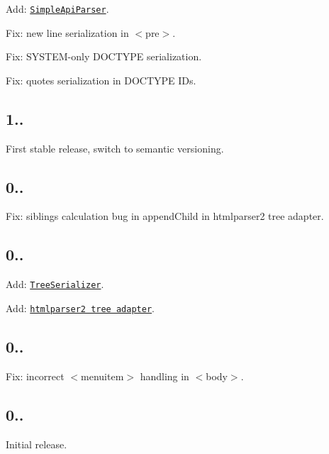 \begin{DoxyItemize}
\item Add\+: \href{https://github.com/inikulin/parse5/#class-simpleapiparser}{\tt Simple\+Api\+Parser}.
\item Fix\+: new line serialization in {\ttfamily $<$pre$>$}.
\item Fix\+: {\ttfamily S\+Y\+S\+T\+EM}-\/only {\ttfamily D\+O\+C\+T\+Y\+PE} serialization.
\item Fix\+: quotes serialization in {\ttfamily D\+O\+C\+T\+Y\+PE} I\+Ds.
\end{DoxyItemize}

\subsection*{1..}


\begin{DoxyItemize}
\item First stable release, switch to semantic versioning.
\end{DoxyItemize}

\subsection*{0..}


\begin{DoxyItemize}
\item Fix\+: siblings calculation bug in {\ttfamily append\+Child} in {\ttfamily htmlparser2} tree adapter.
\end{DoxyItemize}

\subsection*{0..}


\begin{DoxyItemize}
\item Add\+: \href{https://github.com/inikulin/parse5/#class-serializer}{\tt Tree\+Serializer}.
\item Add\+: \href{https://github.com/inikulin/parse5/#-treeadaptershtmlparser2}{\tt htmlparser2 tree adapter}.
\end{DoxyItemize}

\subsection*{0..}


\begin{DoxyItemize}
\item Fix\+: incorrect {\ttfamily $<$menuitem$>$} handling in {\ttfamily $<$body$>$}.
\end{DoxyItemize}

\subsection*{0..}


\begin{DoxyItemize}
\item Initial release. 
\end{DoxyItemize}